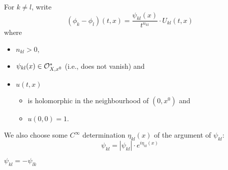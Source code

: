 For $k\neq l$, write
\[
  (\phi_k-\phi_l)(t,x)=\frac{\psi_{kl}(x)}{t^{n_{kl}}}\cdot U_{kl}(t,x)
\]
where
\begin{itemize}
  \item $n_{kl}>0$,
  \item $\psi_{kl}(x)\in\mathcal{O}_{X,x^0}^*$ (i.e., does not vanish) and
  \item $u(t,x)$
    \begin{itemize}
      \item is holomorphic in the neighbourhood of $(0,x^0)$ and
      \item $u(0,0)=1$.
    \end{itemize}
\end{itemize}
We also choose some $C^\infty$ determination $\eta_{kl}(x)$ of the argument of
$\psi_{kl}$:
\[
  \psi_{kl}=|\psi_{kl}|\cdot e^{i\eta_{kl}(x)}
\]
\begin{rem}
  $\psi_{kl}=-\psi_{lk}$
\end{rem}
